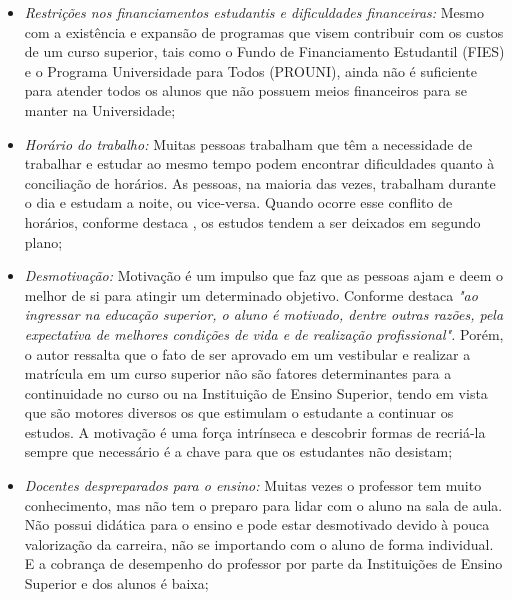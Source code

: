 \begin{itemize}
\item \textit{Restrições nos financiamentos estudantis e dificuldades financeiras:} Mesmo com a existência e expansão de programas que visem contribuir com os custos de um curso superior, tais como o Fundo de Financiamento Estudantil (FIES) e o Programa Universidade para Todos (PROUNI), ainda não é suficiente para atender todos os alunos que não possuem meios financeiros para se manter na Universidade;

\item \textit{Horário do trabalho:} Muitas pessoas trabalham que têm a necessidade de trabalhar e estudar ao mesmo tempo podem encontrar dificuldades quanto à conciliação de horários. As pessoas, na maioria das vezes, trabalham durante o dia e estudam a noite, ou vice-versa. Quando ocorre esse conflito de horários, conforme destaca \citet{tigrinho2008}, os estudos tendem a ser deixados em segundo plano;

\item \textit{Desmotivação:} Motivação é um impulso que faz que as pessoas ajam e deem o melhor de si para atingir um determinado objetivo. Conforme destaca \citet{tigrinho2008} \textit{"ao ingressar na educação superior, o aluno é motivado, dentre outras razões, pela expectativa de melhores condições de vida e de realização profissional".} Porém, o autor ressalta que o fato de ser aprovado em um vestibular e realizar a matrícula em um curso superior não são fatores determinantes para a continuidade no curso ou na Instituição de Ensino Superior, tendo em vista que são motores diversos os que estimulam o estudante a continuar os estudos. A motivação é uma força intrínseca e descobrir formas de recriá-la sempre que necessário é a chave para que os estudantes não desistam;

\item \textit{Docentes despreparados para o ensino:} Muitas vezes o professor tem muito conhecimento, mas não tem o preparo para lidar com o aluno na sala de aula. Não possui didática para o ensino e pode estar desmotivado devido à pouca valorização da carreira, não se importando com o aluno de forma individual. E a cobrança de desempenho do professor por parte da Instituições de Ensino Superior e dos alunos é baixa;


\end{itemize}
